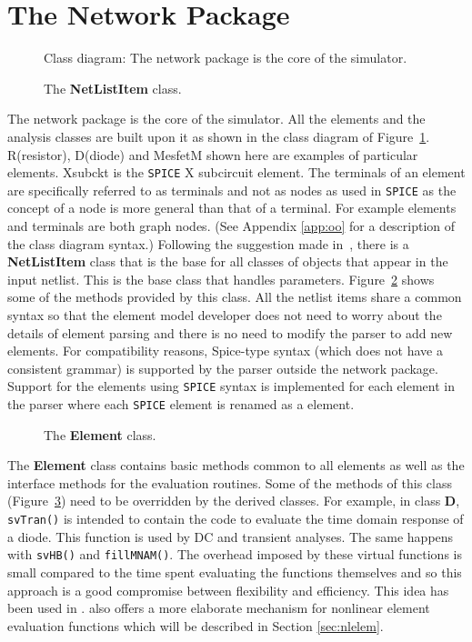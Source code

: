 \section{The Network Package}
%
\begin{figure}
\centerline{\epsfxsize=13cm }
\caption{Class diagram: The network package is the core of the
simulator.\label{fig:network}}
\end{figure}
%
%
\begin{figure}[htpb]
\centerline{\epsfxsize=6cm }
\caption{The {\bf NetListItem} class.}
\label{fig:netlistitemclass}
\end{figure}
%
The network package is the core of the simulator. All the elements and
the analysis classes are built upon it as shown in the class diagram
of Figure~\ref{fig:network}. R(resistor), D(diode) and MesfetM shown
here are examples of particular elements. Xsubckt is the \texttt{SPICE}
X subcircuit element. The terminals of an element are specifically
referred to as terminals and not as nodes as used in \texttt{SPICE}
as the concept of a node is more general than that of a terminal. For
example elements and terminals are both graph nodes.
(See Appendix \ref{app:oo} for a description of the class diagram syntax.)
Following the suggestion made in~\cite{davis1}, there is a {\bf NetListItem}
class that is the base for all classes of objects that appear in the input
netlist. This is the base class that handles parameters.
Figure~\ref{fig:netlistitemclass} shows some of the methods provided by
this class. All the netlist items share a common syntax so that the
element model developer does not need to worry about the details of element
parsing and there is no need to modify the parser to add new elements.
For compatibility reasons, Spice-type syntax (which does not have a consistent
grammar) is supported by the parser outside the network package. Support
for the elements using \texttt{SPICE} syntax is implemented for each
element in the parser where each \texttt{SPICE} element is renamed as a \FDA element.

%
\begin{figure}[htpb]
\centerline{\epsfxsize=6cm } \caption{The
{\bf Element} class.} \label{fig:elementclass}
\end{figure}
%
The {\bf Element} class contains basic methods common to all elements
as well as the interface methods for the evaluation routines.  Some of
the methods of this class (Figure~\ref{fig:elementclass}) need to be
overridden by the derived classes. For example, in class {\bf D},
{\tt svTran()} is intended to contain the code to evaluate the time
domain response of a diode. This function is used by DC and transient
analyses. The same happens with {\tt svHB()} and {\tt fillMNAM()}.
The overhead imposed by these virtual functions is small compared to
the time spent evaluating the functions themselves and so this
approach is a good compromise between flexibility and efficiency. This
idea has been used in \cite{codecs,davis1,feldmann}. \FDA also
offers a more elaborate mechanism for nonlinear element evaluation
functions which will be described in Section \ref{sec:nlelem}.

